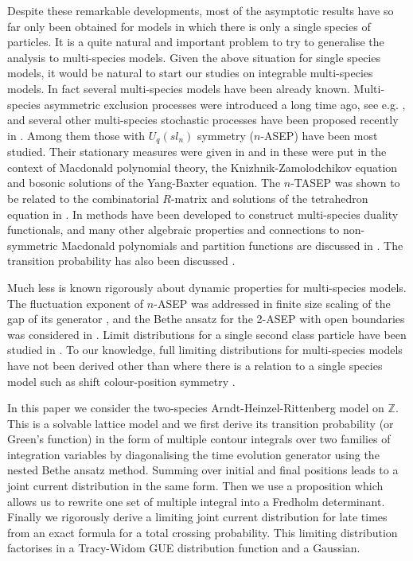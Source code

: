 \documentclass[cmp]{svjour}
\numberwithin{theorem}{section}
\numberwithin{equation}{section}
\begin{document}
Despite these remarkable developments, most of the asymptotic results have so far only been obtained for models in which there is only a single species of particles. It is a quite natural and important problem to try to generalise the analysis to multi-species models. Given the above situation for single species
models, it would be natural to start our studies on integrable multi-species models. In fact several multi-species models
have been already known. Multi-species asymmetric exclusion processes were
introduced a long time ago, see e.g. \cite{PhysRevE.59.205,Mallick_1999,Derrida_exactsolution}, and several other multi-species stochastic processes have been proposed recently in \cite{kuniba2016multispecies}. Among them those with $U_q(sl_n)$ symmetry ($n$-ASEP) have been most studied. Their stationary measures were given in \cite{ferrari2007,PEM2009} and in \cite{Cantini_2015} these were put in the context of Macdonald polynomial theory, the Knizhnik-Zamolodchikov equation and bosonic solutions of the Yang-Baxter equation. The $n$-TASEP was shown to be related to the combinatorial $R$-matrix and solutions of the tetrahedron equation in \cite{kuniba2016multispecies,Kuniba_2016}. In \cite{ChenGW,Kuan_2018} methods have been developed to construct multi-species duality functionals, and many other algebraic properties and connections to non-symmetric Macdonald polynomials and partition functions are discussed in \cite{BW2018p}. The transition probability has also been discussed \cite{tracy2013asymmetric,kuan2019probability,lee2018exact}. 


Much less is known rigorously about dynamic properties for multi-species models. The fluctuation exponent of $n$-ASEP was addressed in finite size scaling of the gap of its generator \cite{arita2009spectrum}, and the Bethe ansatz for the 2-ASEP with open boundaries was considered in \cite{Zhang_2019}. Limit distributions for a single second class particle have been studied in \cite{FNG2019, Nejjar2019}. To our knowledge, full limiting distributions for multi-species models have not been derived other than where there is a relation to a single species model such as shift colour-position symmetry \cite{borodin2019colorposition,borodin2020shiftinvariance}. 

In this paper we consider the two-species Arndt-Heinzel-Rittenberg model on $\mathbb{Z}$. This is a solvable lattice model and we first derive its transition probability (or Green's function) in the form of multiple contour integrals over two families of integration variables by diagonalising the time evolution generator using the nested Bethe ansatz method. Summing over initial and final positions leads to a joint current distribution in the same form. Then we use a proposition which allows us to rewrite one set of multiple integral into a Fredholm determinant.    
Finally we rigorously derive a limiting joint current distribution for late times from an exact formula for a total crossing probability. This limiting distribution factorises in a Tracy-Widom GUE distribution function and a Gaussian.   
\end{document}
